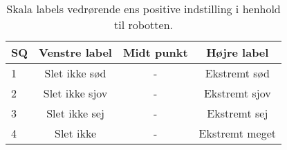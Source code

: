 %
\begin{table}[H]
	\centering
	\begin{tabular}{l|c|c|c}
		SQ     & Venstre label & Midt punkt & Højre label \\\hline
		1   & Slet ikke sød & - & Ekstremt sød      \\\hline
		2   & Slet ikke sjov & - & Ekstremt sjov \\\hline
		3   & Slet ikke sej & - & Ekstremt sej \\\hline
		4   & Slet ikke & - & Ekstremt meget
	\end{tabular}
\caption{Skala labels vedrørende ens positive indstilling i henhold til robotten.}
\label{tab:PositivR} 
\end{table}
\noindent
%





